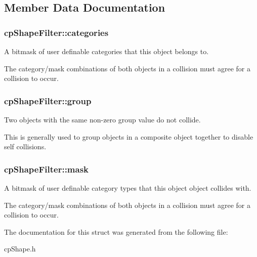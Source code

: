 \subsection{Member Data Documentation}
\hypertarget{structcp_shape_filter_a916b2d61e3ea9d1e7d26a6bc59ac955b}{}
\subsubsection[{categories}]{ cp\+Shape\+Filter\+::categories}\label{structcp_shape_filter_a916b2d61e3ea9d1e7d26a6bc59ac955b}


A bitmask of user definable categories that this object belongs to. 

The category/mask combinations of both objects in a collision must agree for a collision to occur. \hypertarget{structcp_shape_filter_a6d29bf3cc7f406cdf834465f9de71c21}{}
\subsubsection[{group}]{ cp\+Shape\+Filter\+::group}\label{structcp_shape_filter_a6d29bf3cc7f406cdf834465f9de71c21}


Two objects with the same non-\/zero group value do not collide. 

This is generally used to group objects in a composite object together to disable self collisions. \hypertarget{structcp_shape_filter_a0ee36d60cbc25e1abf18aa1508d7a537}{}
\subsubsection[{mask}]{ cp\+Shape\+Filter\+::mask}\label{structcp_shape_filter_a0ee36d60cbc25e1abf18aa1508d7a537}


A bitmask of user definable category types that this object object collides with. 

The category/mask combinations of both objects in a collision must agree for a collision to occur. 

The documentation for this struct was generated from the following file\+:\begin{DoxyCompactItemize}
\item 
cp\+Shape.\+h\end{DoxyCompactItemize}
